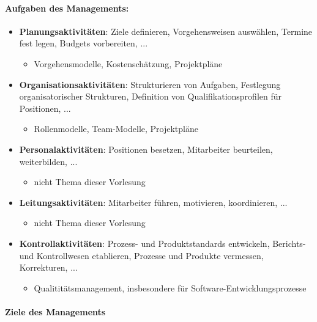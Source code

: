 \paragraph{Aufgaben des Managements:}
\begin{itemize}
	\item \textbf{Planungsaktivitäten}: Ziele definieren, Vorgehensweisen auswählen, Termine fest legen, Budgets vorbereiten, ...
	\begin{itemize}
		\item Vorgehensmodelle, Kostenschätzung, Projektpläne
	\end{itemize}
	\item \textbf{Organisationsaktivitäten}: Strukturieren von Aufgaben, Festlegung organisatorischer Strukturen, Definition von Qualifikationsprofilen für Positionen, ...
	\begin{itemize}
		\item Rollenmodelle, Team-Modelle, Projektpläne
	\end{itemize}
	\item \textbf{Personalaktivitäten}: Positionen besetzen, Mitarbeiter beurteilen, weiterbilden, ...
	\begin{itemize}
		\item nicht Thema dieser Vorlesung
	\end{itemize}
	\item  \textbf{Leitungsaktivitäten}: Mitarbeiter führen, motivieren, koordinieren, ...
	\begin{itemize}
		\item nicht Thema dieser Vorlesung
	\end{itemize}
	\item  \textbf{Kontrollaktivitäten}: Prozess- und Produktstandards entwickeln, Berichts- und Kontrollwesen etablieren, Prozesse und Produkte vermessen, Korrekturen, ...
	\begin{itemize}
		\item Qualititätsmanagement, insbesondere für Software-Entwicklungsprozesse
	\end{itemize}
\end{itemize}

\paragraph{Ziele des Managements}

